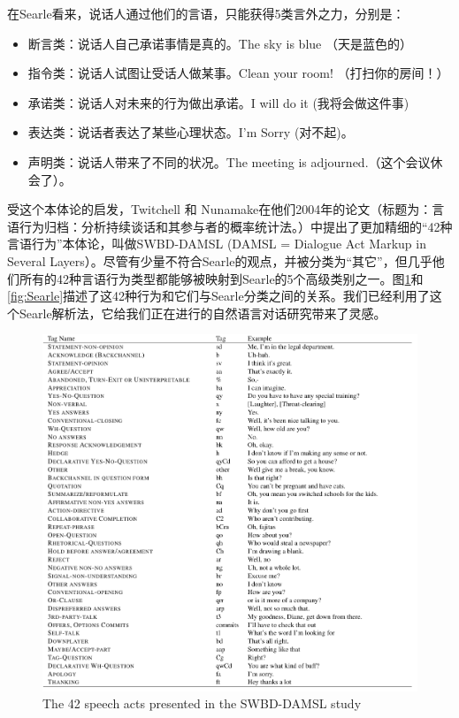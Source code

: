 在Searle看来，说话人通过他们的言语，只能获得5类言外之力，分别是：

\begin{itemize}
\item 断言类：说话人自己承诺事情是真的。The sky is blue （天是蓝色的）
\item 指令类：说话人试图让受话人做某事。Clean your room! （打扫你的房间！）
\item 承诺类：说话人对未来的行为做出承诺。I will do it (我将会做这件事)
\item 表达类：说话者表达了某些心理状态。I’m Sorry (对不起)。
\item 声明类：说话人带来了不同的状况。The meeting is adjourned.（这个会议休会了）。
\end{itemize} 

受这个本体论的启发，Twitchell 和 Nunamake在他们2004年的论文（标题为：言语行为归档：分析持续谈话和其参与者的概率统计法。\cite{Twitchell2004}）中提出了更加精细的“42种言语行为”本体论，叫做SWBD-DAMSL (DAMSL = Dialogue Act Markup in Several Layers）。尽管有少量不符合Searle的观点，并被分类为“其它”，但几乎他们所有的42种言语行为类型都能够被映射到Searle的5个高级类别之一。图\ref{fig:DAMSL}和\ref{fig:Searle}描述了这42种行为和它们与Searle分类之间的关系。我们已经利用了这个Searle解析法，它给我们正在进行的自然语言对话研究带来了灵感。

\begin{figure}[htb]
\centering
\includegraphics[width=12cm]{figures/DAMSL.png}
\caption{ The 42 speech acts presented in the SWBD-DAMSL study}
\label{fig:DAMSL}
\end{figure}

